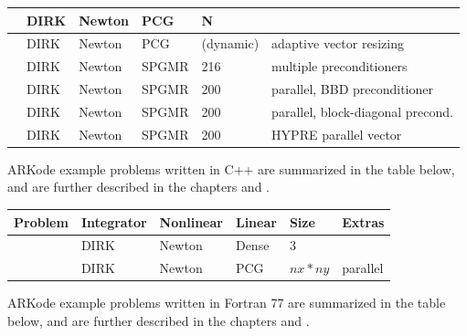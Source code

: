 \documentclass[letterpaper,10pt,english]{sphinxmanual}
\begin{document}
\begin{tabulary}{\linewidth}{|L|L|L|L|L|L|}
 & 
DIRK
 & 
Newton
 & 
PCG
 & 
N
 & \\
\hline
{\hyperref[c_serial:ark-heat1d-adapt]{\emph{}}}
 & 
DIRK
 & 
Newton
 & 
PCG
 & 
(dynamic)
 & 
adaptive vector resizing
\\
\hline
{\hyperref[c_serial:ark-krylovdemo-prec]{\emph{}}}
 & 
DIRK
 & 
Newton
 & 
SPGMR
 & 
216
 & 
multiple preconditioners
\\
\hline
{\hyperref[c_parallel:ark-diurnal-kry-bbd-p]{\emph{}}}
 & 
DIRK
 & 
Newton
 & 
SPGMR
 & 
200
 & 
parallel, BBD preconditioner
\\
\hline
{\hyperref[c_parallel:ark-diurnal-kry-p]{\emph{}}}
 & 
DIRK
 & 
Newton
 & 
SPGMR
 & 
200
 & 
parallel, block-diagonal precond.
\\
\hline
{\hyperref[c_parhyp:ark-diurnal-kry-ph]{\emph{}}}
 & 
DIRK
 & 
Newton
 & 
SPGMR
 & 
200
 & 
HYPRE parallel vector
\\
\hline\end{tabulary}


ARKode example problems written in C++ are summarized in the table
below, and are further described in the chapters {\hyperref[cpp_serial:serial-cpp]{\emph{}}} and
{\hyperref[cpp_parallel:parallel-cpp]{\emph{}}}.

\begin{tabulary}{\linewidth}{|L|L|L|L|L|L|}
\hline
\textsf{\relax 
Problem
} & \textsf{\relax 
Integrator
} & \textsf{\relax 
Nonlinear
} & \textsf{\relax 
Linear
} & \textsf{\relax 
Size
} & \textsf{\relax 
Extras
}\\
\hline
{\hyperref[cpp_serial:ark-analytic-sys]{\emph{}}}
 & 
DIRK
 & 
Newton
 & 
Dense
 & 
3
 & \\
\hline
{\hyperref[cpp_parallel:ark-heat2d]{\emph{}}}
 & 
DIRK
 & 
Newton
 & 
PCG
 & 
\(nx*ny\)
 & 
parallel
\\
\hline\end{tabulary}


ARKode example problems written in Fortran 77 are summarized in the table
below, and are further described in the chapters {\hyperref[f77_serial:serial-f77]{\emph{}}} and
{\hyperref[f77_parallel:parallel-f77]{\emph{}}}.
\end{document}
